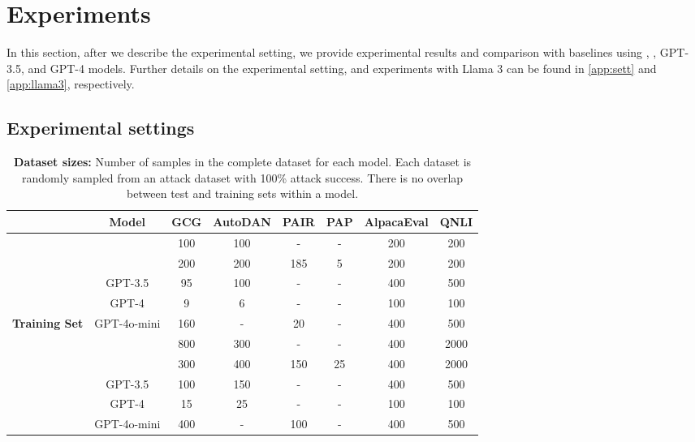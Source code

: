 
\section{Experiments}
In this section, after we describe the experimental setting, we provide experimental results and comparison with baselines using \llama{}, \vicuna{}, GPT-3.5, and GPT-4 models. Further details on the experimental setting, and experiments with Llama 3 can be found in \cref{app:sett} and \cref{app:llama3}, respectively. 

\subsection{Experimental settings}

\begin{table}[tb]
\caption{\textbf{Dataset sizes:} Number of samples in the complete dataset for each model. Each dataset is randomly sampled from an attack dataset with 100\% attack success. There is no overlap between test and training sets within a model.}
\label{table:data}
\begin{center}
\begin{footnotesize}
\begin{tabular}{ c c c c c c c c }
\toprule
\rowcolor{black!10} & Model  & GCG & AutoDAN &PAIR&PAP& AlpacaEval & QNLI\\
\midrule
&\llama{}                                                        &100&100&-&-& 200 & 200 \\
&\vicuna{}                                                       &200&200&185&5& 200 & 200\\
&GPT-3.5                  &95&100&-&-&400&500\\
&GPT-4                    &9&6&-&-&100&100\\
\multirow{-5}{*}{\textbf{Training Set}}&GPT-4o-mini                 &160&-&20&-&400&500\\
\bottomrule
\rowcolor{black!10} &\llama{}                                    &800&300&-&-& 400 & 2000 \\
\rowcolor{black!10}&\vicuna{}                                    &300&400&150&25& 400 &2000\\
\rowcolor{black!10}&GPT-3.5   &100&150&-&-&400&500 \\
\rowcolor{black!10}&GPT-4                 &15&25&-&-&100&100\\
\rowcolor{black!10}\multirow{-5}{*}{\textbf{Test Set}}&GPT-4o-mini   &400&-&100&-&400&500\\
\bottomrule
\end{tabular}
\end{footnotesize}
\end{center}
\vskip -0.1in
\end{table}

